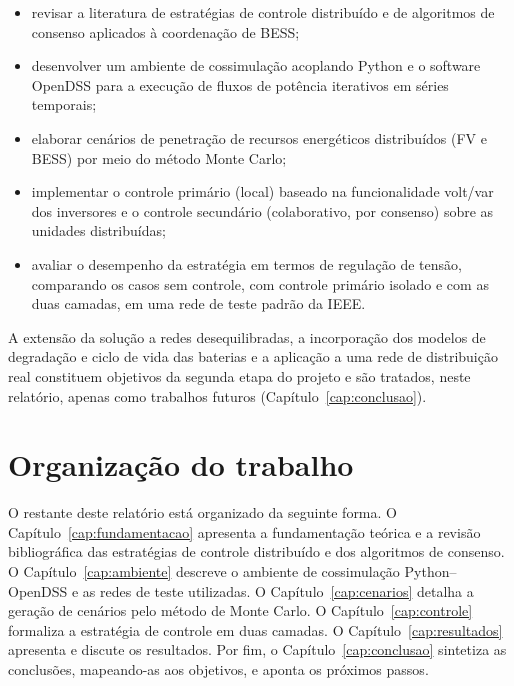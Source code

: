 \begin{itemize}
  \item revisar a literatura de estratégias de controle distribuído e de algoritmos de consenso aplicados à coordenação de BESS;
  \item desenvolver um ambiente de cossimulação acoplando Python e o software OpenDSS para a execução de fluxos de potência iterativos em séries temporais;
  \item elaborar cenários de penetração de recursos energéticos distribuídos (FV e BESS) por meio do método Monte Carlo;
  \item implementar o controle primário (local) baseado na funcionalidade volt/var dos inversores e o controle secundário (colaborativo, por consenso) sobre as unidades distribuídas;
  \item avaliar o desempenho da estratégia em termos de regulação de tensão, comparando os casos sem controle, com controle primário isolado e com as duas camadas, em uma rede de teste padrão da IEEE.
\end{itemize}

A extensão da solução a redes desequilibradas, a incorporação dos modelos de degradação e ciclo de vida 
das baterias e a aplicação a uma rede de distribuição real constituem objetivos da segunda etapa do 
projeto e são tratados, neste relatório, apenas como trabalhos futuros (Capítulo~\ref{cap:conclusao}).

\section{Organização do trabalho}
\label{sec:organizacao}

O restante deste relatório está organizado da seguinte forma. O Capítulo~\ref{cap:fundamentacao} 
apresenta a fundamentação teórica e a revisão bibliográfica das estratégias de controle distribuído e 
dos algoritmos de consenso. O Capítulo~\ref{cap:ambiente} descreve o ambiente de cossimulação 
Python--OpenDSS e as redes de teste utilizadas. O Capítulo~\ref{cap:cenarios} detalha a geração de 
cenários pelo método de Monte Carlo. O Capítulo~\ref{cap:controle} formaliza a estratégia de controle em 
duas camadas. O Capítulo~\ref{cap:resultados} apresenta e discute os resultados. Por fim, o 
Capítulo~\ref{cap:conclusao} sintetiza as conclusões, mapeando-as aos objetivos, e aponta os próximos 
passos.
